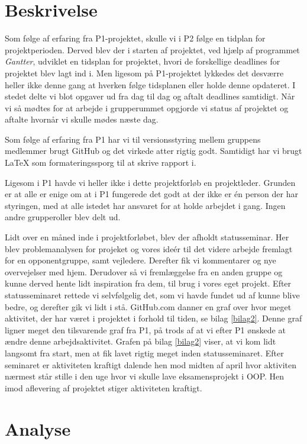 \section{Beskrivelse}
Som følge af erfaring fra P1-projektet, skulle vi i P2 følge en tidplan for projektperioden. Derved blev der i starten af projektet, ved hjælp af programmet \textit{Gantter}, udviklet en tidsplan for projektet, hvori de forskellige deadlines for projektet blev lagt ind i. Men ligesom på P1-projektet lykkedes det desværre heller ikke denne gang at hverken følge tidsplanen eller holde denne opdateret. I stedet delte vi blot opgaver ud fra dag til dag og aftalt deadlines samtidigt. Når vi så mødtes for at arbejde i grupperummet opgjorde vi status af projektet og aftalte hvornår vi skulle mødes næste dag. 

Som følge af erfaring fra P1 har vi til versionsstyring mellem gruppens medlemmer brugt GitHub og det virkede atter rigtig godt. Samtidigt har vi brugt \LaTeX{} som formateringssporg til at skrive rapport i.   

Ligesom i P1 havde vi heller ikke i dette projektforløb en projektleder. Grunden er at alle er enige om at i P1 fungerede det godt at der ikke er én person der har styringen, med at alle istedet har ansvaret for at holde arbejdet i gang. Ingen andre grupperoller blev delt ud.  

Lidt over en måned inde i projektforløbet, blev der afholdt statusseminar. Her blev problemanalysen for projeket og vores ideér til det videre arbejde fremlagt for en opponentgruppe, samt vejledere. Derefter fik vi kommentarer og nye overvejelser med hjem. Derudover så vi fremlæggelse fra en anden gruppe og kunne derved hente lidt inspiration fra dem, til brug i vores eget projekt. Efter statusseminaret rettede vi selvfølgelig det, som vi havde fundet ud af kunne blive bedre, og derefter gik vi lidt i stå. GitHub.com danner en graf over hvor meget aktivitet, der har været i projektet i forhold til tiden, se bilag \ref{bilag2}. Denne graf ligner meget den tilsvarende graf fra P1, på trods af at vi efter P1 ønskede at ændre denne arbejdsaktivitet. Grafen på bilag \ref{bilag2} viser, at vi kom lidt langsomt fra start, men at fik lavet rigtig meget inden statusseminaret. Efter seminaret er aktiviteten kraftigt dalende hen mod midten af april hvor aktiviten nærmest står stille i den uge hvor vi skulle lave eksamensprojekt i OOP. Hen imod aflevering af projektet stiger aktiviteten kraftigt. 

\section{Analyse}

